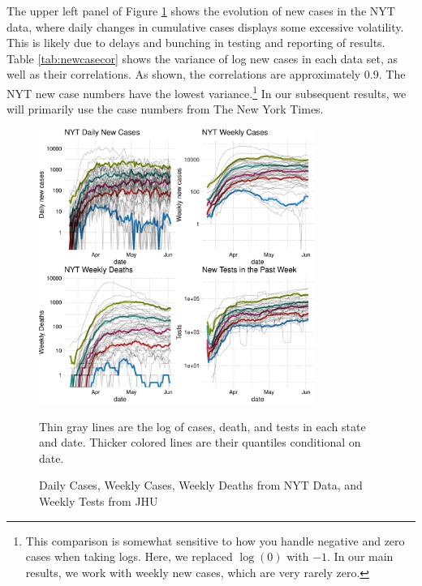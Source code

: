 \documentclass[11pt,reqno,letter]{amsart}
\theoremstyle{definition}
\begin{document}





The upper left panel of Figure \ref{fig:casedeathtest} shows the evolution of new cases in the NYT data, where daily changes in cumulative
cases displays some excessive volatility. This is likely due to delays
and bunching in testing and reporting of results.
Table
\ref{tab:newcasecor} shows the variance of log new cases in each data
set, as well as their correlations. As shown, the correlations are
approximately $0.9$. The NYT new case
numbers have the lowest variance.\footnote{This comparison is somewhat
  sensitive to how you handle negative and zero cases when taking
  logs. Here, we replaced $\log(0)$ with $-1$. In our main
  results, we work with weekly new cases, which are very rarely zero.}
In our subsequent results, we will primarily use the case numbers from
The New York Times.

\begin{figure}[!ht]\caption{Daily Cases, Weekly Cases,  Weekly Deaths from NYT Data, and Weekly Tests from JHU\label{fig:casedeathtest}}\smallskip
  \centering
  \begin{minipage}{\textwidth}
    \centering
    \includegraphics[width=0.8\textwidth,height=0.7\textwidth]{tables_and_figures/casesdeaths_q}
  \end{minipage}
     \begin{flushleft}
      \footnotesize Thin gray lines are the log of cases, death, and tests  in each
      state and date. Thicker colored lines are their quantiles conditional on date.
      \end{flushleft}
\end{figure}
\end{document}
